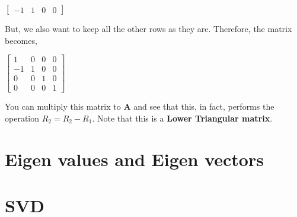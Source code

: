\documentclass[a4paper]{article}
\begin{document}
            \begin{center}
                $
                \begin{bmatrix}
                    -1 & 1 & 0 & 0 
                \end{bmatrix}
                $
            \end{center}
            
            But, we also want to keep all the other rows as they are. Therefore, the matrix becomes,
            
            \begin{center}
                $
                    \begin{bmatrix}
                    1  & 0 & 0 & 0 \\
                    -1 & 1 & 0 & 0 \\
                    0  & 0 & 1 & 0 \\
                    0  & 0 & 0 & 1 
                    \end{bmatrix}
                $
            \end{center}
            
            You can multiply this matrix to $\mathbf{A}$ and see that this, in fact, performs the operation $R_2 = R_2 - R_1$. Note that this is a \textbf{Lower Triangular matrix}.
            
\section{Eigen values and Eigen vectors}

\section{SVD}
\end{document}
